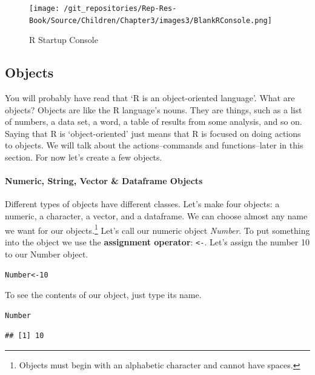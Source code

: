 \documentclass[ChapterTOCs,krantz1]{krantz}\usepackage{graphicx, color}
\makeatletter
\newenvironment{kframe}{%
 \def\at@end@of@kframe{}%
 \ifinner\ifhmode%
  \def\at@end@of@kframe{\end{minipage}}%
  \begin{minipage}{\columnwidth}%
 \fi\fi%
 \def\FrameCommand##1{\hskip\@totalleftmargin \hskip-\fboxsep
 \colorbox{shadecolor}{##1}\hskip-\fboxsep
     \hskip-\linewidth \hskip-\@totalleftmargin \hskip\columnwidth}%
 \MakeFramed {\advance\hsize-\width
   \@totalleftmargin\z@ \linewidth\hsize
   \@setminipage}}%
 {\par\unskip\endMakeFramed%
 \at@end@of@kframe}
\newenvironment{knitrout}{}{} %
\makeatother
\begin{document}
\begin{figure}[th!]
    \caption{R Startup Console}
    \label{RBlankMain}

    \texttt{[image: /git\_repositories/Rep-Res-Book/Source/Children/Chapter3/images3/BlankRConsole.png]}
\end{figure}

\subsection{Objects}

You will probably have read that `R is an object-oriented language'.  What are objects? Objects are like the R language's nouns. They are things, such as a list of numbers, a data set, a word, a table of results from some analysis, and so on. Saying that R is `object-oriented' just means that R is focused on doing actions to objects. We will talk about the actions--commands and functions--later in this section. For now let's create a few objects.

\paragraph{Numeric, String, Vector \& Dataframe Objects}

Different types of objects have different classes. Let's make four objects: a numeric, a character, a vector, and a dataframe. We can choose almost any name we want for our objects.\footnote{Objects must begin with an alphabetic character and cannot have spaces.} Let's call our numeric object {\emph{Number}}. To put something into the object we use the {\bf{assignment operator}}: {\tt{\textless -}}. Let's assign the number 10 to our Number object.

\begin{knitrout}
\color{fgcolor}\begin{kframe}
\begin{alltt}
Number <- 10
\end{alltt}
\end{kframe}
\end{knitrout}


\noindent To see the contents of our object, just type its name.

\begin{knitrout}
\color{fgcolor}\begin{kframe}
\begin{alltt}
Number
\end{alltt}
\begin{verbatim}
## [1] 10
\end{verbatim}
\end{kframe}
\end{knitrout}
\end{document}
